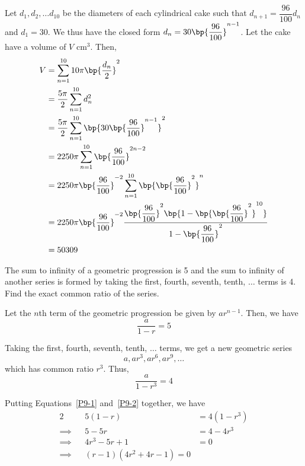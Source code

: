 \documentclass{echw}
\begin{document}
    \solution
        Let $d_1, d_2, \ldots d_{10}$ be the diameters of each cylindrical cake such that $d_{n+1} = \dfrac{96}{100}d_n$ and $d_1 = 30$. We thus have the closed form $d_n = 30\bp{\dfrac{96}{100}}^{n-1}$. Let the cake have a volume of $V$ cm$^3$. Then,
        \begin{align*}
            V &= \sum_{n=1}^{10} 10\pi \bp{\dfrac{d_n}2}^2 \\
            &= \dfrac{5\pi}2 \sum_{n=1}^{10} d^2_n \\
            &= \dfrac{5\pi}2 \sum_{n=1}^{10} \bp{30\bp{\dfrac{96}{100}}^{n-1}}^2\\
            &= 2250\pi \sum_{n=1}^{10} \bp{\dfrac{96}{100}}^{2n-2}\\
            &= 2250\pi \bp{\dfrac{96}{100}}^{-2} \sum_{n=1}^{10} \bp{\bp{\dfrac{96}{100}}^2}^{n}\\
            &= 2250\pi \bp{\dfrac{96}{100}}^{-2} \dfrac{\bp{\dfrac{96}{100}}^2 \bp{1 - \bp{\bp{\dfrac{96}{100}}^2}^{10}}}{1-\bp{\dfrac{96}{100}}^2}\\
            &= 50309
        \end{align*}


    \problem{}
        The sum to infinity of a geometric progression is 5 and the sum to infinity of another series is formed by taking the first, fourth, seventh, tenth, $\ldots$ terms is 4. Find the exact common ratio of the series.

    \solution
        Let the $n$th term of the geometric progression be given by $ar^{n-1}$. Then, we have
        \begin{equation}\label{P9-1}
            \dfrac{a}{1-r} = 5
        \end{equation}

        Taking the first, fourth, seventh, tenth, $\ldots$ terms, we get a new geometric series
        \[
            a, ar^3, ar^6, ar^9, \ldots
        \]
        which has common ratio $r^3$. Thus,
        \begin{equation}\label{P9-2}
            \dfrac{a}{1-r^3} = 4
        \end{equation}

        Putting Equations~\ref{P9-1} and~\ref{P9-2} together, we have
        \begin{alignat*}{2}
            &&5(1-r) &= 4(1-r^3)\\
            \implies&&5-5r &= 4 - 4r^3\\
            \implies&& 4r^3-5r+1 &= 0\\
            \implies&& (r-1)(4r^2+4r-1) = 0
        \end{alignat*}
\end{document}
